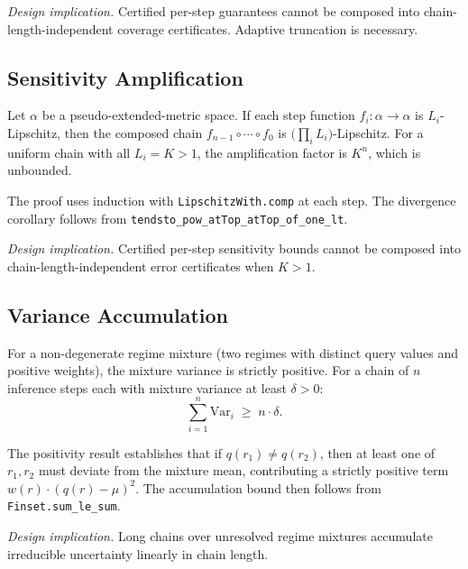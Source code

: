 \documentclass[11pt,openany]{report}
\begin{document}
\textit{Design implication.}  Certified per-step guarantees cannot be
composed into chain-length-independent coverage certificates.  Adaptive
truncation is necessary.

\subsection*{Sensitivity Amplification}

\begin{theorem}
\label{thm:sensitivity-amplification}
Let $\alpha$ be a pseudo-extended-metric space.  If each step function
$f_i : \alpha \to \alpha$ is $L_i$-Lipschitz, then the composed chain
$f_{n-1} \circ \cdots \circ f_0$ is $\bigl(\prod_{i} L_i\bigr)$-Lipschitz.
For a uniform chain with all $L_i = K > 1$, the amplification factor is
$K^n$, which is unbounded.
\end{theorem}

The proof uses induction with \texttt{LipschitzWith.comp} at each step.
The divergence corollary follows from
\texttt{tendsto\_pow\_atTop\_atTop\_of\_one\_lt}.

\textit{Design implication.}  Certified per-step sensitivity bounds cannot
be composed into chain-length-independent error certificates when $K > 1$.

\subsection*{Variance Accumulation}

\begin{theorem}
\label{thm:variance-accumulation}
For a non-degenerate regime mixture (two regimes with distinct query values
and positive weights), the mixture variance is strictly positive.
For a chain of $n$ inference steps each with mixture variance at least
$\delta > 0$:
\[
  \sum_{i=1}^{n} \mathrm{Var}_i \;\ge\; n \cdot \delta.
\]
\end{theorem}

The positivity result establishes that if $q(r_1) \ne q(r_2)$, then
at least one of $r_1, r_2$ must deviate from the mixture mean, contributing
a strictly positive term $w(r) \cdot (q(r) - \mu)^2$.  The accumulation bound
then follows from \texttt{Finset.sum\_le\_sum}.

\textit{Design implication.}  Long chains over unresolved regime mixtures
accumulate irreducible uncertainty linearly in chain length.
\end{document}

